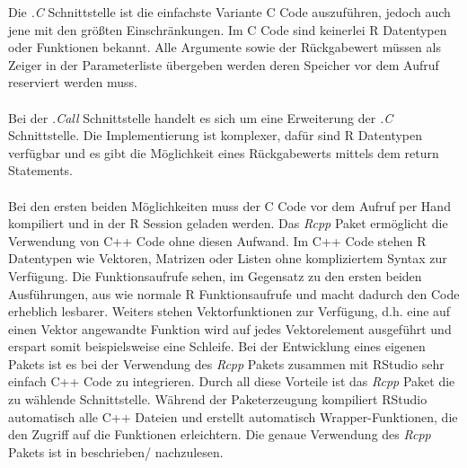 Die \emph{.C} Schnittstelle ist die einfachste Variante C Code auszuführen, jedoch auch jene mit den größten Einschränkungen. Im C Code sind keinerlei R Datentypen oder Funktionen bekannt. Alle Argumente sowie der Rückgabewert müssen als Zeiger in der Parameterliste übergeben werden deren Speicher vor dem Aufruf reserviert werden muss.
\\
\\
Bei der \emph{.Call} Schnittstelle handelt es sich um eine Erweiterung der \emph{.C} Schnittstelle. Die Implementierung ist komplexer, dafür sind R Datentypen verfügbar und es gibt die Möglichkeit eines Rückgabewerts mittels dem return Statements. \cite{wickham2015r}
\\
\\
Bei den ersten beiden Möglichkeiten muss der C Code vor dem Aufruf per Hand kompiliert und in der R Session geladen werden. Das \emph{Rcpp} Paket ermöglicht die Verwendung von C++ Code ohne diesen Aufwand. Im C++ Code stehen R Datentypen wie Vektoren, Matrizen oder Listen ohne kompliziertem Syntax zur Verfügung. Die Funktionsaufrufe sehen, im Gegensatz zu den ersten beiden Ausführungen, aus wie normale R Funktionsaufrufe und macht dadurch den Code erheblich lesbarer. Weiters stehen Vektorfunktionen zur Verfügung, d.h. eine auf einen Vektor angewandte Funktion wird auf jedes Vektorelement ausgeführt und erspart somit beispielsweise eine Schleife. Bei der Entwicklung eines eigenen Pakets ist es bei der Verwendung des \emph{Rcpp} Pakets zusammen mit RStudio sehr einfach C++ Code zu integrieren. Durch all diese Vorteile ist das \emph{Rcpp} Paket die zu wählende Schnittstelle. Während der Paketerzeugung kompiliert RStudio automatisch alle C++ Dateien und erstellt automatisch Wrapper-Funktionen, die den Zugriff auf die Funktionen erleichtern. Die genaue Verwendung des \emph{Rcpp} Pakets ist in \cite{wickham2015advanced} beschrieben/ nachzulesen.
